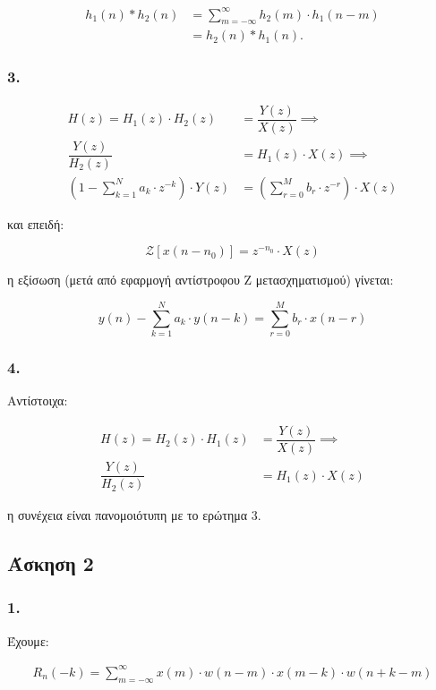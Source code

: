 \documentclass[12pt,a4paper]{article}
\begin{document}
			\begin{align*}
				h_1(n) \ast h_2(n) &= \sum_{m=-\infty}^{\infty}h_2(m) \cdot h_1(n-m) \\
				&= h_2(n) \ast h_1(n).
			\end{align*}
		
		\subsubsection*{3.}
			\begin{align*}
				H(z) = H_1(z) \cdot H_2(z) &= \dfrac{Y(z)}{X(z)} \implies \\
				\dfrac{Y(z)}{H_2(z)} &= H_1(z) \cdot X(z) \implies \\
				\left(1-\sum_{k=1}^{N}a_k \cdot z^{-k}\right) \cdot Y(z) &= \left(\sum_{r=0}^{M}b_r \cdot z^{-r}\right) \cdot X(z) 
			\end{align*}
		
			και επειδή: 
			
			\[
				\mathcal{Z}\left[x(n-n_0)\right]=z^{-n_0} \cdot X(z)
			\]
			
			η εξίσωση (μετά από εφαρμογή αντίστροφου Z μετασχηματισμού) γίνεται:
			
			\[
				y(n) - \sum_{k=1}^{N} a_k \cdot y(n-k) = \sum_{r=0}^{M} b_r \cdot x(n-r)
			\]
			
		\subsubsection*{4.}
			Αντίστοιχα:
			
			\begin{align*}
				H(z) = H_2(z) \cdot H_1(z) &= \dfrac{Y(z)}{X(z)} \implies \\ 
				\dfrac{Y(z)}{H_2(z)} &= H_1(z) \cdot X(z)
			\end{align*}
		
			η συνέχεια είναι πανομοιότυπη με το ερώτημα 3.
			
	\subsection*{Άσκηση 2}
		
		\subsubsection*{1.}
			Έχουμε:
			
			\begin{align*}
				R_n(-k) = \sum_{m=-\infty}^{\infty}x(m) \cdot w(n-m) \cdot x(m-k) \cdot w(n+k-m)
			\end{align*}
		
\end{document}
